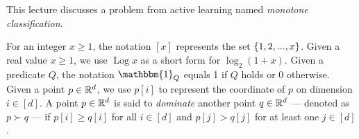 



\usepackage{wasysym}

\title{}
\author{}
\date{}


\def\A{\mathcal{A}}
\def\C{\mathcal{C}}
\def\E{\mathcal{E}}
\def\FF{\EuScript{F}}
\def\G{\mathcal{G}}
\def\GG{\EuScript{G}}
\def\H{\mathcal{H}}
\def\I{\mathcal{I}}
\def\J{\mathcal{J}}
\def\L{\mathcal{L}}
\def\Q{\mathcal{Q}}
\def\S{\mathcal{S}}
\def\T{\mathcal{T}}
\def\V{\mathcal{V}}
\def\W{\mathscr{W}}
\def\X{\mathcal{X}}
\def\Y{\mathcal{Y}}
\def\Z{\mathcal{Z}}

\DeclareMathOperator*{\Log}{Log}
\def\setm{\setminus}

\def\bad{\mit{bad}}
\def\bigmid {\, \Big\lvert \,}
\def\capacity{\mit{cap}}
\def\clean{\mit{clean}}
\def\con{\mit{con}}
\def\cost{\mit{cost}}
\def\cut{\mit{cut}}
\def\det{\mit{det}}
\def\dis{\textrm{DIS}}
\def\dom{\succ}
\def\dombyeq{\preceq}
\def\domeq{\succeq}
\def\err{\mit{err}}
\def\errate{\mit{err}\textrm{-}\mit{rate}}
\def\good{\mit{good}}
\def\lab{\mit{label}}
\def\loc{\textrm{loc}}
\def\middle{\mit{mid}}
\def\mono{\mathbb{H}_\mit{mon}}
\def\neg{\mit{neg}}
\def\newstar{\circledast}
\def\pos{\mit{pos}}
\def\ran{\mit{ran}}
\def\rest{\mit{rest}}
\def\rpe{\mathrm{RPE}}
\def\siml{\mathit{sim}}
\def\sink{\sqsupset}
\def\src{\sqsubset}
\def\starnum{\mathfrak{s}}
\def\totalcost{\mit{family\textrm{-}cost}}
\def\totalerr{\mit{family\textrm{-}err}}
\def\weight{\mit{weight}}
\def\werr{\mit{w}\textrm{-}\mit{err}}

\def\extraspacing{\vspace{4mm} \noindent}
\def\vgap{\vspace{4mm}}
\def\vslit{\vspace{2mm}}




This lecture discusses a problem from active learning named {\em monotone classification}.


\extraspacing {\bf Math Conventions.} For an integer $x \ge 1$, the notation $[x]$ represents the set $\{1, 2, ..., x\}$. Given a real value $x \ge 1$, we use $\Log x$ as a short form for $\log_2 (1 + x)$. Given a predicate $Q$, the notation $\mathbbm{1}_Q$ equals 1 if $Q$ holds or 0 otherwise. Given a point $p \in \mathbb{R}^d$, we use $p[i]$ to represent the coordinate of $p$ on dimension $i \in [d]$. A point $p \in \mathbb{R}^d$ is said to {\em dominate} another point $q \in \mathbb{R}^d$ --- denoted as $p \dom q$ --- if $p[i] \ge q[i]$ for all $i \in [d]$ and $p[j] > q[j]$ for at least one $j \in [d]$.


